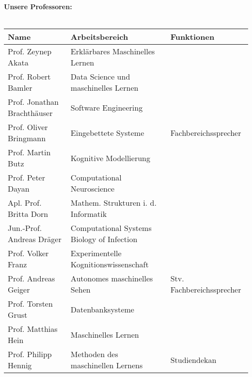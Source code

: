 \renewcommand{\arraystretch}{1}
\scriptsize
\textbf{Unsere Professoren:}\\\\
\begin{tabular}{|lll|}
	\hline
	Name                             & Arbeitsbereich                                        & Funktionen                               \\
	\hline
	\hline
	Prof. Zeynep Akata               & Erklärbares Maschinelles Lernen                       &                                          \\
	Prof. Robert Bamler              & Data Science und maschinelles Lernen                  &                                          \\
	Prof. Jonathan Brachthäuser      & Software Engineering                                  &                                          \\
	Prof. Oliver Bringmann           & Eingebettete Systeme                                  & Fachbereichssprecher                     \\
	Prof. Martin Butz                & Kognitive Modellierung                                &                                          \\
	Prof. Peter Dayan                & Computational Neuroscience                            &                                          \\
	Apl. Prof. Britta Dorn           & Mathem. Strukturen i. d. Informatik                   &                                          \\
	Jun.-Prof. Andreas Dräger        & Computational Systems Biology of Infection            &                                          \\
	Prof. Volker Franz               & Experimentelle Kognitionswissenschaft                 &                                          \\
	Prof. Andreas Geiger             & Autonomes maschinelles Sehen                          & Stv. Fachbereichssprecher                \\
	Prof. Torsten Grust              & Datenbanksysteme                                      &                                          \\
	Prof. Matthias Hein              & Maschinelles Lernen                                   &                                          \\
	Prof. Philipp Hennig             & Methoden des maschinellen Lernens                     & Studiendekan                             \\

\end{tabular}
